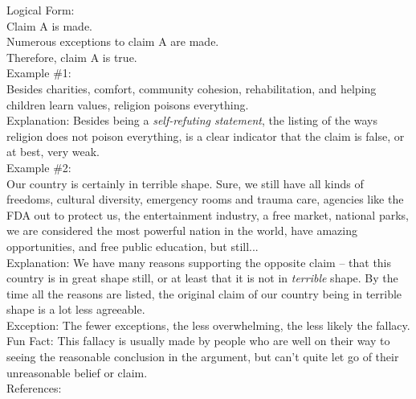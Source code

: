 \documentclass[a4paper,12pt,single,pdftex]{scrartcl}
\begin{document}
    
      Logical Form:
    \\

    
      Claim A is made.
    \\

    
      Numerous exceptions to claim A are made.
    \\

    
      Therefore, claim A is true.
    \\

    
      Example \#1:
    \\

    
      Besides charities, comfort, community cohesion, rehabilitation, and helping children learn values, religion poisons everything.
    \\

    
      Explanation: Besides being a {\it self-refuting statement}, the listing of the ways religion does not poison everything, is a clear indicator that the claim is false, or at best, very weak.
    \\

    
      Example \#2:
    \\

    
      Our country is certainly in terrible shape.  Sure, we still have all kinds of freedoms, cultural diversity, emergency rooms and trauma care, agencies like the FDA out to protect us, the entertainment industry, a free market, national parks, we are considered the most powerful nation in the world, have amazing opportunities, and free public education, but still...
    \\

    
      Explanation: We have many reasons supporting the opposite claim -- that this country is in great shape still, or at least that it is not in {\it terrible}  shape.  By the time all the reasons are listed, the original claim of our country being in terrible shape is a lot less agreeable.
    \\

    
      Exception: The fewer exceptions, the less overwhelming, the less likely the fallacy.
    \\

    
      Fun Fact: This fallacy is usually made by people who are well on their way to seeing the reasonable conclusion in the argument, but can’t quite let go of their unreasonable belief or claim.
    \\

    References:
\end{document}
